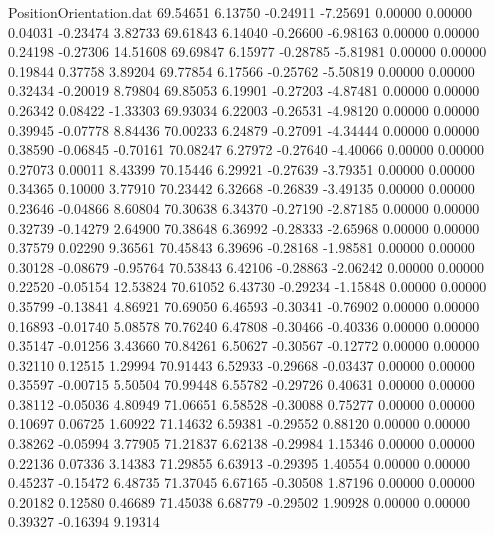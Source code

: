 \begin{filecontents}{PositionOrientation.dat}
  69.54651    6.13750   -0.24911    -7.25691    0.00000    0.00000    0.04031   -0.23474    3.82733
  69.61843    6.14040   -0.26600    -6.98163    0.00000    0.00000    0.24198   -0.27306   14.51608
  69.69847    6.15977   -0.28785    -5.81981    0.00000    0.00000    0.19844    0.37758    3.89204
  69.77854    6.17566   -0.25762    -5.50819    0.00000    0.00000    0.32434   -0.20019    8.79804
  69.85053    6.19901   -0.27203    -4.87481    0.00000    0.00000    0.26342    0.08422   -1.33303
  69.93034    6.22003   -0.26531    -4.98120    0.00000    0.00000    0.39945   -0.07778    8.84436
  70.00233    6.24879   -0.27091    -4.34444    0.00000    0.00000    0.38590   -0.06845   -0.70161
  70.08247    6.27972   -0.27640    -4.40066    0.00000    0.00000    0.27073    0.00011    8.43399
  70.15446    6.29921   -0.27639    -3.79351    0.00000    0.00000    0.34365    0.10000    3.77910
  70.23442    6.32668   -0.26839    -3.49135    0.00000    0.00000    0.23646   -0.04866    8.60804
  70.30638    6.34370   -0.27190    -2.87185    0.00000    0.00000    0.32739   -0.14279    2.64900
  70.38648    6.36992   -0.28333    -2.65968    0.00000    0.00000    0.37579    0.02290    9.36561
  70.45843    6.39696   -0.28168    -1.98581    0.00000    0.00000    0.30128   -0.08679   -0.95764
  70.53843    6.42106   -0.28863    -2.06242    0.00000    0.00000    0.22520   -0.05154   12.53824
  70.61052    6.43730   -0.29234    -1.15848    0.00000    0.00000    0.35799   -0.13841    4.86921
  70.69050    6.46593   -0.30341    -0.76902    0.00000    0.00000    0.16893   -0.01740    5.08578
  70.76240    6.47808   -0.30466    -0.40336    0.00000    0.00000    0.35147   -0.01256    3.43660
  70.84261    6.50627   -0.30567    -0.12772    0.00000    0.00000    0.32110    0.12515    1.29994
  70.91443    6.52933   -0.29668    -0.03437    0.00000    0.00000    0.35597   -0.00715    5.50504
  70.99448    6.55782   -0.29726     0.40631    0.00000    0.00000    0.38112   -0.05036    4.80949
  71.06651    6.58528   -0.30088     0.75277    0.00000    0.00000    0.10697    0.06725    1.60922
  71.14632    6.59381   -0.29552     0.88120    0.00000    0.00000    0.38262   -0.05994    3.77905
  71.21837    6.62138   -0.29984     1.15346    0.00000    0.00000    0.22136    0.07336    3.14383
  71.29855    6.63913   -0.29395     1.40554    0.00000    0.00000    0.45237   -0.15472    6.48735
  71.37045    6.67165   -0.30508     1.87196    0.00000    0.00000    0.20182    0.12580    0.46689
  71.45038    6.68779   -0.29502     1.90928    0.00000    0.00000    0.39327   -0.16394    9.19314

\end{filecontents}
